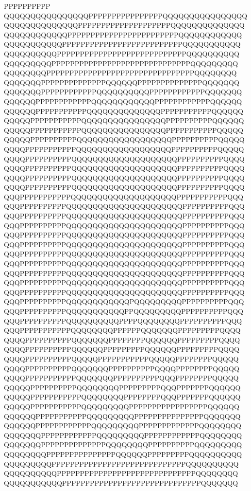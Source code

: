 {{{\blankpix  PPPPPPPPPP\cr
QQQQQQQQQQQQQQQQPPPPPPPPPPPPPPPPQQQQQQQQQQQQQQQQ\cr
QQQQQQQQQQQQQQPPPPPPPPPPPPPPPPPPPPQQQQQQQQQQQQQQ\cr
QQQQQQQQQQQQPPPPPPPPPPPPPPPPPPPPPPPPQQQQQQQQQQQQ\cr
QQQQQQQQQQQPPPPPPPPPPPPPPPPPPPPPPPPPPQQQQQQQQQQQ\cr
QQQQQQQQQQPPPPPPPPPPPPPPPPPPPPPPPPPPPPQQQQQQQQQQ\cr
QQQQQQQQQPPPPPPPPPPPPPPPPPPPPPPPPPPPPPPQQQQQQQQQ\cr
QQQQQQQQPPPPPPPPPPPPPPPPPPPPPPPPPPPPPPPPQQQQQQQQ\cr
QQQQQQQPPPPPPPPPPPPPPQQQQQQPPPPPPPPPPPPPPQQQQQQQ\cr
QQQQQQQPPPPPPPPPPPPQQQQQQQQQQPPPPPPPPPPPPQQQQQQQ\cr
QQQQQQPPPPPPPPPPPPQQQQQQQQQQQQPPPPPPPPPPPPQQQQQQ\cr
QQQQQQPPPPPPPPPPPQQQQQQQQQQQQQQPPPPPPPPPPPQQQQQQ\cr
QQQQQPPPPPPPPPPPQQQQQQQQQQQQQQQQPPPPPPPPPPQQQQQQ\cr
QQQQQPPPPPPPPPPPQQQQQQQQQQQQQQQQPPPPPPPPPPPQQQQQ\cr
QQQQQPPPPPPPPPPQQQQQQQQQQQQQQQQQQPPPPPPPPPPQQQQQ\cr
QQQQPPPPPPPPPPPQQQQQQQQQQQQQQQQQQPPPPPPPPPPQQQQQ\cr
QQQQPPPPPPPPPPQQQQQQQQQQQQQQQQQQQQPPPPPPPPPPQQQQ\cr
QQQQPPPPPPPPPPQQQQQQQQQQQQQQQQQQQQPPPPPPPPPPQQQQ\cr
QQQQPPPPPPPPPPQQQQQQQQQQQQQQQQQQQQPPPPPPPPPPQQQQ\cr
QQQQPPPPPPPPPPQQQQQQQQQQQQQQQQQQQQPPPPPPPPPPQQQQ\cr
QQQPPPPPPPPPPPQQQQQQQQQQQQQQQQQQQQPPPPPPPPPPPQQQ\cr
QQQPPPPPPPPPPQQQQQQQQQQQQQQQQQQQQQQPPPPPPPPPPQQQ\cr
QQQPPPPPPPPPPQQQQQQQQQQQQQQQQQQQQQQPPPPPPPPPPQQQ\cr
QQQPPPPPPPPPPQQQQQQQQQQQQQQQQQQQQQQPPPPPPPPPPQQQ\cr
QQQPPPPPPPPPPQQQQQQQQQQQQQQQQQQQQQQPPPPPPPPPPQQQ\cr
QQQPPPPPPPPPPQQQQQQQQQQQQQQQQQQQQQQPPPPPPPPPPQQQ\cr
QQQPPPPPPPPPPQQQQQQQQQQQQQQQQQQQQQQPPPPPPPPPPQQQ\cr
QQQPPPPPPPPPPQQQQQQQQQQQQQQQQQQQQQQPPPPPPPPPPQQQ\cr
QQQPPPPPPPPPPQQQQQQQQQQQQQQQQQQQQQQPPPPPPPPPPQQQ\cr
QQQPPPPPPPPPPQQQQQQQQQQQQQQQQQQQQQQPPPPPPPPPPQQQ\cr
QQQPPPPPPPPPPQQQQQQQQQQQQQQQQQQQQQQPPPPPPPPPPQQQ\cr
QQQPPPPPPPPPPQQQQQQQQQQQQPQQQQQQQQQPPPPPPPPPPQQQ\cr
QQQPPPPPPPPPPQQQQQQQQQQQPPQQQQQQQQQPPPPPPPPPPQQQ\cr
QQQPPPPPPPPPPQQQQQQQQQQPPPPQQQQQQQQPPPPPPPPPPQQQ\cr
QQQPPPPPPPPPPPQQQQQQQQPPPPPPQQQQQQQPPPPPPPPPQQQQ\cr
QQQQPPPPPPPPPPQQQQQQQPPPPPPPPQQQQQQPPPPPPPPPQQQQ\cr
QQQQPPPPPPPPPPQQQQQQPPPPPPPPPQQQQQQPPPPPPPPPQQQQ\cr
QQQQPPPPPPPPPPQQQQQPPPPPPPPPPPQQQQQPPPPPPPPQQQQQ\cr
QQQQPPPPPPPPPPQQQQQQQPPPPPPPPPPQQQQPPPPPPPPQQQQQ\cr
QQQQPPPPPPPPPPPQQQQQQQPPPPPPPPPPQQQPPPPPPPPQQQQQ\cr
QQQQQPPPPPPPPPPQQQQQQQQPPPPPPPPPQQQPPPPPPPQQQQQQ\cr
QQQQQPPPPPPPPPPPQQQQQQQQPPPPPPPPQQQPPPPPPPQQQQQQ\cr
QQQQQPPPPPPPPPPPQQQQQQQQQPPPPPPPPPPPPPPPPPQQQQQQ\cr
QQQQQQPPPPPPPPPPPQQQQQQQQQPPPPPPPPPPPPPPPQQQQQQQ\cr
QQQQQQPPPPPPPPPPPPQQQQQQQQQPPPPPPPPPPPPPQQQQQQQQ\cr
QQQQQQQPPPPPPPPPPPPQQQQQQQQQPPPPPPPPPPPPQQQQQQQQ\cr
QQQQQQQPPPPPPPPPPPPPPQQQQQQQQPPPPPPPPPPQQQQQQQQQ\cr
QQQQQQQQPPPPPPPPPPPPPPPQQQQQQPPPPPPPPPQQQQQQQQQQ\cr
QQQQQQQQQPPPPPPPPPPPPPPPPPPPPPPPPPPPPPQQQQQQQQQQ\cr
QQQQQQQQQQPPPPPPPPPPPPPPPPPPPPPPPPPPPPPPQQQQQQQQ\cr
QQQQQQQQQQQPPPPPPPPPPPPPPPPPPPPPPPPPPPPPPQQQQQQQ\cr
}}}
